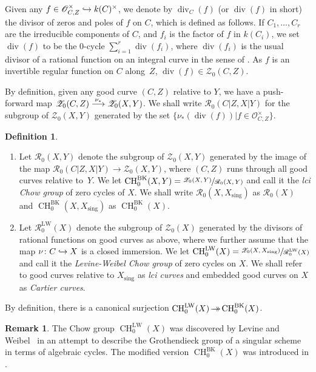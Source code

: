 \documentclass[JEP,XML,SOM,Unicode,published]{cedram}
\let\mathcal\mathscr
\def\hto{\mathrel{\lhook\joinrel\to}}
\newcommand{\onto}{\mathchoice{\to\hspace*{-5mm}\to}{\hspace*{-.5mm}\to\hspace*{-2.85mm}\to\hspace*{-.5mm}}{\to\hspace*{-3mm}\to}{\to\hspace*{-3mm}\to}}
\def\To#1{\mathchoice{\xrightarrow{\textstyle\kern4pt#1\kern3pt}}{\stackrel{#1}{\longrightarrow}}{}{}}
\let\surj\onto
\let\inj\hto
\newcommand{\BK}{\mathrm{BK}}
\newcommand{\LW}{\mathrm{LW}}
\theoremstyle{definition}
\newtheorem{defn}[thm]{Definition}
\newtheorem{remk}[thm]{Remark}
\newcommand{\sO}{{\mathcal O}}\let\cO\sO
\newcommand{\sR}{{\mathcal R}}
\newcommand{\sZ}{{\mathcal Z}}
\DeclareMathOperator{\CH}{CH}
\DeclareMathOperator{\divf}{div}
\newcommand{\sing}{\mathrm{sing}}
\begin{document}
Given any $f \in \sO^{\times}_{C, Z} \inj k(C)^{\times}$, we denote by
$\divf_C(f)$ (or $\divf(f)$ in short)
the divisor of zeros and poles of $f$ on $C$, which is defined as follows. If
$C_1,\ldots, C_r$ are the irreducible components of $C$,
and $f_i$ is the factor of $f$ in $k(C_i)$, we set
$\divf(f)$ to be the $0$-cycle $\sum_{i=1}^r \divf(f_i)$, where
$\divf(f_i)$ is the usual
divisor of a rational function on an integral curve in the sense of
\cite{Fulton}. As $f$ is an invertible
regular function on $C$ along~$Z$, $\divf(f)\in \sZ_0(C,Z)$.

By definition, given any good curve $(C,Z)$ relative to $Y$, we have a
push-forward map $\sZ_0(C,Z)\To{\nu_{*}} \sZ_0(X,Y)$.
We shall write $\sR_0(C|Z, X|Y)$ for the subgroup
of $\sZ_0(X, Y)$ generated by the set
$\{\nu_*(\divf(f))| f \in \sO^{\times}_{C, Z}\}$.

\skpt
\begin{defn} \label{def:LWandlciChow}
\begin{enumerate}
\item
Let $\sR_0(X,Y)$ denote the subgroup of $\sZ_0(X, Y)$ generated
by
the image of the map $\sR_0(C|Z, X|Y) \to \sZ_0(X, Y)$, where
$(C, Z)$ runs through all good curves relative to~$Y$.
We let $\CH^{\BK}_0(X,Y) = \sfrac{\sZ_0(X, Y)}{\sR_0(X,Y)}$ and call it the
\emph{lci Chow group} of zero cycles of $X$.
We shall write $\sR_0(X,X_\sing)$ as $\sR_0(X)$ and $\CH^{\BK}_0(X,X_\sing)$
as $\CH^{\BK}_0(X)$.

\item
Let $\sR^{\LW}_0(X)$ denote the subgroup of $\sZ_0(X)$ generated
by the divisors of rational functions on good curves as above, where
we further assume that the map $\nu\colon C \inj X$ is a closed immersion.
We let $\CH^{\LW}_0(X)=\sfrac{\sZ_0(X, X_{\sing})}{\sR^{\LW}_0(X)}$ and call it
the \emph{Levine-Weibel Chow group} of zero cycles on $X$.
We shall refer to good curves relative to $X_\sing$ as \emph{lci curves} and
embedded good curves on $X$ as \emph{Cartier curves}.\enlargethispage{\baselineskip}%
\end{enumerate}
\end{defn}
By definition, there is a canonical surjection
$\CH^{\LW}_0(X) \surj \CH^{\BK}_0(X)$.

\begin{remk}
The Chow group $\CH^{\LW}_0(X)$ was
discovered by Levine and Weibel~\cite{LW} in an attempt to describe the
Grothendieck group of a singular scheme in terms of algebraic cycles.
The modified version $\CH^{\BK}_0(X)$ was introduced in \cite{BK}.
\end{remk}
\end{document}
